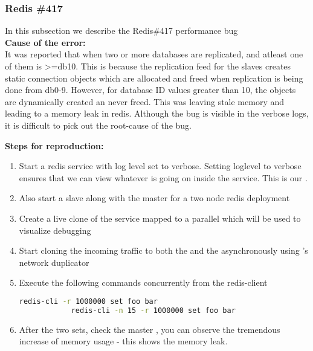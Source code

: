 \subsubsection{Redis \#417}

In this subsection we describe the Redis\#417 performance bug \\

\noindent \textbf{Cause of the error:} \\

It was reported that when two or more databases are replicated, and atleast one of them is >=db10. This is because the replication feed for the slaves creates static connection objects which are allocated and freed when replication is being done from db0-9. However, for database ID values greater than 10, the objects are dynamically created an never freed.
This was leaving stale memory and leading to a memory leak in redis.
Although the bug is visible in the verbose logs, it is difficult to pick out the root-cause of the bug.

\noindent \textbf{Steps for reproduction:} \\

\begin{adjustwidth}{0.5cm}{}
	\begin{enumerate}
		\item Start a redis service with log level set to verbose. Setting loglevel to verbose ensures that we can view whatever is going on inside the service. This is our \productioncontainer.
		\item Also start a slave along with the master for a two node redis deployment
		\item Create a live clone of the service mapped to a parallel \debugcontainer which will be used to visualize debugging
		\item Start cloning the incoming traffic to both the \productioncontainer and the \debugcontainer asynchronously using \parikshan's network duplicator
		
		\item Execute the following commands concurrently from the redis-client
		
		\begin{lstlisting}[language=sh]
			redis-cli -r 1000000 set foo bar
			redis-cli -n 15 -r 1000000 set foo bar
		\end{lstlisting}
		
		\item After the two sets, check the master \debugcontainer, you can observe the tremendous increase of memory usage - this shows the memory leak.
		
	\end{enumerate}
\end{adjustwidth}	


